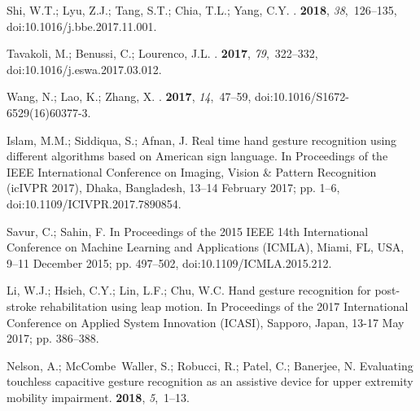 \documentclass[sensors,review,accept,moreauthors,pdftex]{Definitions/mdpi}
\begin{document}
\begin{thebibliography}{999}
\providecommand{\natexlab}[1]{#1}

Shi, W.T.; Lyu, Z.J.; Tang, S.T.; Chia, T.L.; Yang, C.Y.
.
 {\bf 2018}, {\em
  38},~126--135, doi:10.1016/j.bbe.2017.11.001.

Tavakoli, M.; Benussi, C.; Lourenco, J.L.
.
 {\bf 2017}, {\em
  79},~322--332, doi:10.1016/j.eswa.2017.03.012.

Wang, N.; Lao, K.; Zhang, X.
.
 {\bf 2017}, {\em 14},~47--59, doi:10.1016/S1672-6529(16)60377-3.

Islam, M.M.; Siddiqua, S.; Afnan, J.
\newblock Real time hand gesture recognition using different algorithms based
  on American sign language. In {Proceedings of the }IEEE International Conference on Imaging, Vision \& Pattern Recognition (icIVPR 2017), Dhaka, Bangladesh, 13--14 February 2017; pp. 1--6, doi:10.1109/ICIVPR.2017.7890854.

Savur, C.; Sahin, F.
 In {Proceedings of the  2015 IEEE 14th International Conference on Machine Learning and Applications (ICMLA),} Miami, FL, USA,  9--11 December 2015; 
\newblock pp. 497--502, doi:10.1109/ICMLA.2015.212.

Li, W.J.; Hsieh, C.Y.; Lin, L.F.; Chu, W.C.
\newblock Hand gesture recognition for post-stroke rehabilitation using leap
  motion.
In {Proceedings of the  2017 International Conference on Applied System Innovation (ICASI),} Sapporo, Japan, 13-17 May 2017; pp. 386--388.

Nelson, A.; McCombe~Waller, S.; Robucci, R.; Patel, C.; Banerjee, N.
\newblock Evaluating touchless capacitive gesture recognition as an assistive
  device for upper extremity mobility impairment.
 {\bf 2018}, {\em 5},~1--13.


\end{thebibliography}
\end{document}
